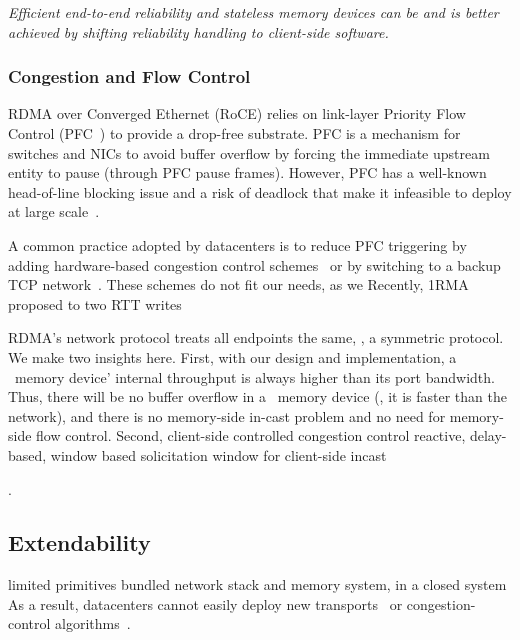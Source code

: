 \textit{Efficient end-to-end reliability and stateless memory devices can be and is better achieved by shifting reliability handling to client-side software.}

\subsubsection{Congestion and Flow Control}
\label{sec:cc}

RDMA over Converged Ethernet (RoCE) relies on link-layer Priority Flow Control (PFC~\cite{PFC}) to provide a drop-free substrate.
PFC is a mechanism for switches and NICs to avoid buffer overflow by forcing the immediate upstream entity to pause (through PFC pause frames).
However, PFC has a well-known head-of-line blocking issue and a risk of deadlock that make it infeasible to deploy at large scale~\cite{Zhu15-SIGCOMM}.

A common practice adopted by datacenters is to reduce PFC triggering by adding hardware-based congestion control schemes~\cite{Zhu15-SIGCOMM,hpcc-sigcomm19}
or by switching to a backup TCP network~\cite{RDMA-NSDI21}.
These schemes do not fit our needs, as we 
Recently, 1RMA~\cite{1RMA} proposed to 
two RTT writes

RDMA's network protocol treats all endpoints the same, \ie, a symmetric protocol.
We make two insights here.
First, with our design and implementation, a \sys\ memory device' internal throughput is always higher than its port bandwidth.
Thus, there will be no buffer overflow in a \sys\ memory device (\ie, it is faster than the network), 
and there is no memory-side in-cast problem and no need for memory-side flow control.
Second, 
client-side controlled congestion control
reactive, delay-based, window based 
solicitation window for client-side incast

\textit{}.

\subsection{Extendability}
\label{sec:extendability}

limited primitives
bundled network stack and memory system, in a closed system
As a result, datacenters cannot easily deploy new transports~\cite{Homa,NDP,pHost} or congestion-control algorithms~\cite{1RMA,XXX}.

